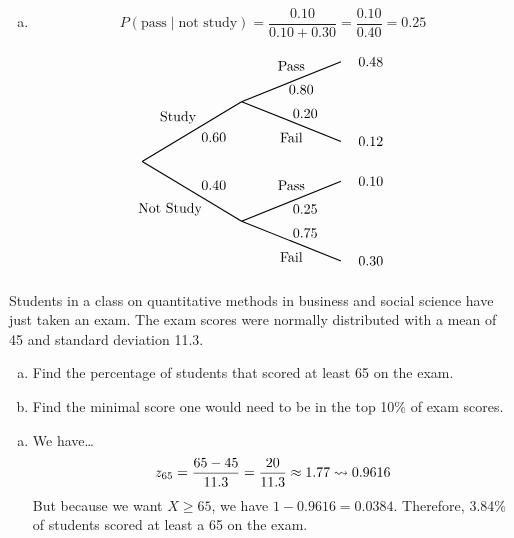 \documentclass[12pt,letterpaper]{exam}
\begin{document}
\begin{questions}
\begin{enumerate}[(a)]
\item 
	\[
	P(\text{pass} \;|\; \text{not study})= \dfrac{0.10}{0.10 + 0.30}= \dfrac{0.10}{0.40}= 0.25
	\]
\end{enumerate} \vfill

		\[
		\begin{tikzpicture}[scale= 1.0]
		\def\FirstUpLabel{Study}
		\def\FirstDownLabel{Not Study}
		\def\SecondUpLabel{Pass}
		\def\SecondDownLabel{Fail}
		\def\Up{$0.60$}
		\def\Down{$0.40$}
		\def\UpUp{$0.80$}
		\def\UpDown{$0.20$}
		\def\DownUp{$0.25$}
		\def\DownDown{$0.75$}
		\def\first{$0.48$}
		\def\second{$0.12$}
		\def\third{$0.10$}
		\def\fourth{$0.30$}
		
		\node at (0.9,1.1) {\FirstUpLabel};	
		\node at (0.7,-1.2) {\FirstDownLabel};	
		\node at (1.8,0.6) {\Up};
		\node at (1.8,-0.6) {\Down};
		\draw[thick] (0,0) -- (2.5,1.5);
		\draw[thick] (0,0) -- (2.5,-1.5);
		
		\node at (3.75,2.4) {\SecondUpLabel};
		\node at (3.75,0.6) {\SecondDownLabel};
		\node at (4,1.8) {\UpUp};
		\node at (4.1,1.2) {\UpDown};
		\node at (5.75,2.5) {\first};
		\node at (5.75,0.5) {\second};
		\draw[thick] (2.5,1.5) -- (5,2.5);
		\draw[thick] (2.5,1.5) -- (5,0.5);

		\node at (3.75,-0.6) {\SecondUpLabel};
		\node at (3.75,-2.4) {\SecondDownLabel};
		\node at (4.1,-1.2) {\DownUp};
		\node at (4.1,-1.8) {\DownDown};
		\node at (5.75,-0.5) {\third};	
		\node at (5.75,-2.5) {\fourth};	
		\draw[thick] (2.5,-1.5) -- (5,-0.5);
		\draw[thick] (2.5,-1.5) -- (5,-2.5);
		\end{tikzpicture}
		\]



\newpage
\question[10] Students in a class on quantitative methods in business and social science have just taken an exam. The exam scores were normally distributed with a mean of 45 and standard deviation 11.3. 
	\begin{enumerate}[(a)]
	\item Find the percentage of students that scored at least 65 on the exam. 
	\item Find the minimal score one would need to be in the top 10\% of exam scores. 
	\end{enumerate} \pspace


\sol 
{\itshape 
\begin{enumerate}[(a)]
\item We have\dots
	\[
	z_{65}= \dfrac{65 - 45}{11.3}= \dfrac{20}{11.3} \approx 1.77 \rightsquigarrow 0.9616
	\]
But because we want $X \geq 65$, we have $1 - 0.9616= 0.0384$. Therefore, 3.84\% of students scored at least a 65 on the exam. \pspace


\end{enumerate}}
\end{questions}
\end{document}
